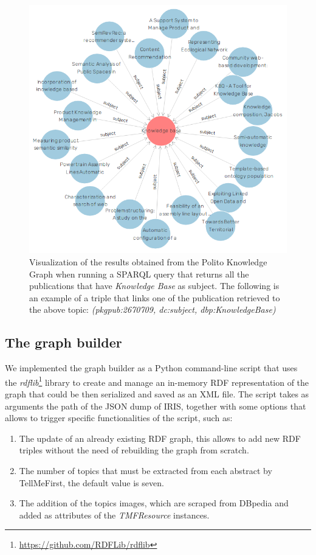 \documentclass[%
    corpo=13.5pt,
    twoside,
    oldstyle,
    tipotesi=magistrale,
    greek,
    evenboxes
]{toptesi}
\begin{document}
\begin{figure}[h]
    \centering
    \includegraphics[scale=0.40]{img/subject_knowledge_base.png}
    \caption{Visualization of the results obtained from
        the Polito Knowledge Graph when running a SPARQL query that returns
        all the publications that have \emph{Knowledge Base}
        as subject. The following is an example of a triple that links one of
        the publication retrieved to the above topic:
        \emph{(pkgpub:2670709, dc:subject, dbp:KnowledgeBase)}}
    \label{fig:subject-knowledge-base}
\end{figure}



\subsection{The graph builder}

We implemented the graph builder as a Python command-line script that uses
the \emph{rdflib}\footnote{\url{https://github.com/RDFLib/rdflib}} library
to create and manage an in-memory RDF representation of the graph that could be
then serialized and saved as an XML file.
The script takes as arguments the path of the JSON dump of IRIS, together
with some options that allows to trigger specific functionalities of the
script, such as:

\begin{enumerate}
    \item The update of an already existing RDF graph, this allows to add new
        RDF triples without the need of rebuilding the graph from scratch.
    \item The number of topics that must be extracted from each abstract by
        TellMeFirst, the default value is seven.
    \item The addition of the topics images, which are scraped from DBpedia and
        added as attributes of the \emph{TMFResource} instances.
\end{enumerate}
\end{document}

